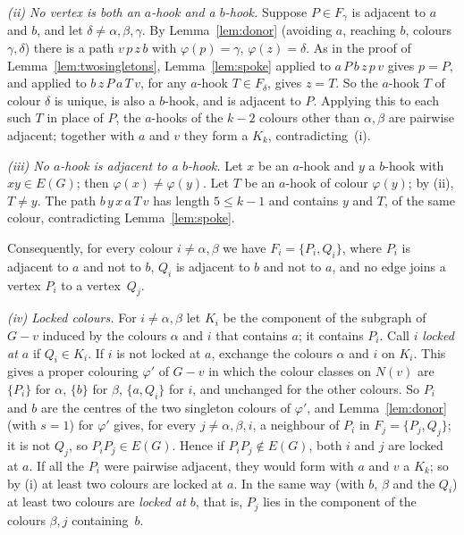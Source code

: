 \documentclass[11pt]{article}
\theoremstyle{remark}
\begin{document}
\emph{(ii) No vertex is both an $a$-hook and a $b$-hook.} Suppose $P\in F_\gamma$
is adjacent to $a$ and $b$, and let $\delta\ne\alpha,\beta,\gamma$. By
Lemma~\ref{lem:donor} (avoiding $a$, reaching $b$, colours $\gamma,\delta$)
there is a path $v\,p\,z\,b$ with $\varphi(p)=\gamma$, $\varphi(z)=\delta$. As
in the proof of Lemma~\ref{lem:twosingletons}, Lemma~\ref{lem:spoke} applied to
$a\,P\,b\,z\,p\,v$ gives $p=P$, and applied to $b\,z\,P\,a\,T\,v$, for any
$a$-hook $T\in F_\delta$, gives $z=T$. So the $a$-hook $T$ of colour $\delta$
is unique, is also a $b$-hook, and is adjacent to $P$. Applying this to each
such $T$ in place of $P$, the $a$-hooks of the $k-2$ colours other than
$\alpha,\beta$ are pairwise adjacent; together with $a$ and $v$ they form a
$K_k$, contradicting~(i).

\emph{(iii) No $a$-hook is adjacent to a $b$-hook.} Let $x$ be an $a$-hook and
$y$ a $b$-hook with $xy\in E(G)$; then $\varphi(x)\ne\varphi(y)$. Let $T$ be an
$a$-hook of colour $\varphi(y)$; by (ii), $T\ne y$. The path $b\,y\,x\,a\,T\,v$
has length $5\le k-1$ and contains $y$ and $T$, of the same colour,
contradicting Lemma~\ref{lem:spoke}.

Consequently, for every colour $i\ne\alpha,\beta$ we have $F_i=\{P_i,Q_i\}$,
where $P_i$ is adjacent to $a$ and not to $b$, $Q_i$ is adjacent to $b$ and not
to $a$, and no edge joins a vertex $P_i$ to a vertex~$Q_j$.

\emph{(iv) Locked colours.} For $i\ne\alpha,\beta$ let $K_i$ be the component
of the subgraph of $G-v$ induced by the colours $\alpha$ and $i$ that contains
$a$; it contains $P_i$. Call $i$ \emph{locked at $a$} if $Q_i\in K_i$. If $i$
is not locked at $a$, exchange the colours $\alpha$ and $i$ on $K_i$. This
gives a proper colouring $\varphi'$ of $G-v$ in which the colour classes on
$N(v)$ are $\{P_i\}$ for $\alpha$, $\{b\}$ for $\beta$, $\{a,Q_i\}$ for $i$,
and unchanged for the other colours. So $P_i$ and $b$ are the centres of the
two singleton colours of $\varphi'$, and Lemma~\ref{lem:donor} (with $s=1$)
for $\varphi'$ gives, for every $j\ne\alpha,\beta,i$, a neighbour of $P_i$ in
$F_j=\{P_j,Q_j\}$; it is not $Q_j$, so $P_iP_j\in E(G)$. Hence if
$P_iP_j\notin E(G)$, both $i$ and $j$ are locked at $a$. If all the $P_i$ were
pairwise adjacent, they would form with $a$ and $v$ a $K_k$; so by (i) at least
two colours are locked at $a$. In the same way (with $b$, $\beta$ and the
$Q_i$) at least two colours are \emph{locked at $b$}, that is, $P_j$ lies in
the component of the colours $\beta,j$ containing~$b$.
\end{document}
